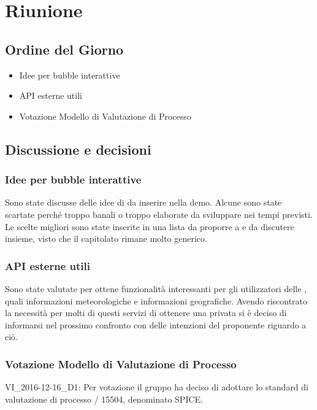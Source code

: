 \section{Riunione}
\subsection{Ordine del Giorno}
\begin{itemize}
	\item Idee per bubble interattive
	\item API esterne utili
	\item Votazione Modello di Valutazione di Processo
\end{itemize}

\subsection{Discussione e decisioni}
\subsubsection{Idee per bubble interattive}
Sono state discusse delle idee di  da inserire nella demo. Alcune sono state scartate perché troppo banali o troppo elaborate da sviluppare nei tempi previsti. Le scelte migliori sono state inserite in una lista da proporre a \Proponente{} e da discutere insieme, visto che il capitolato rimane molto generico.

\subsubsection{API esterne utili}
Sono state valutate  per ottene funzionalità interessanti per gli utilizzatori delle , quali informazioni meteorologiche e informazioni geografiche. Avendo riscontrato la necessità per molti di questi servizi di ottenere una  privata si è deciso di informarsi nel prossimo confronto con \Proponente{} delle intenzioni del proponente riguardo a ciò.  

\subsubsection{Votazione Modello di Valutazione di Processo}
VI_2016-12-16_D1: Per votazione il gruppo \GroupName{} ha deciso di adottare lo standard di valutazione di processo / 15504, denominato SPICE.

\clearpage
